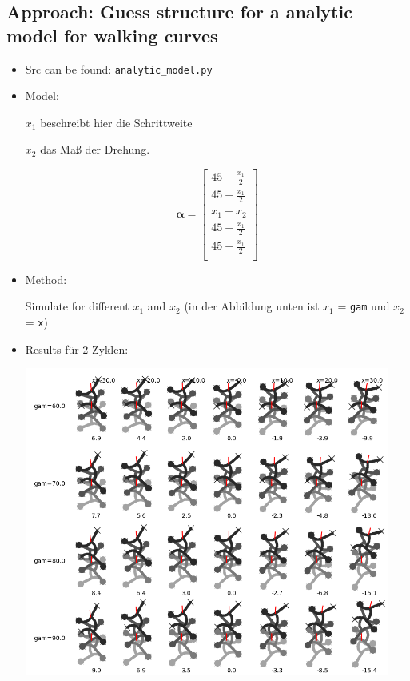 \documentclass[10pt,a4paper]{article}
\begin{document}
\subsection{Approach: Guess structure for a analytic model for walking curves}

\begin{itemize}

\item Src can be found: \texttt{analytic\_model.py}

\item Model:

$x_1$ beschreibt hier die Schrittweite

$x_2$ das Maß der Drehung.

\begin{equation}
\bm{\alpha} = \begin{bmatrix}
45 - \frac{x_1}{2} \\
45 + \frac{x_1}{2} \\
x_1 + x_2 \\
45 - \frac{x_1}{2}  \\
45 + \frac{x_1}{2} \\
\end{bmatrix}
\end{equation}

\item Method:

Simulate for different $x_1$ and $x_2$ (in der Abbildung unten ist $x_1$ = \texttt{gam} und $x_2$ = \texttt{x})

\item Results für 2 Zyklen:

\includegraphics[width=12cm]{../pics/model_1/GeckoBotGait_2cyc.png}



\end{itemize}
\end{document}

